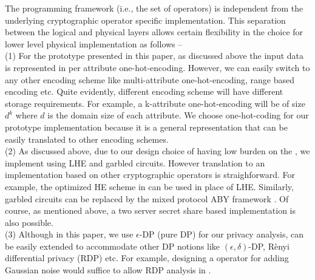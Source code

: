{ The programming framework (i.e., the set of \system operators) is independent from the underlying cryptographic operator specific implementation. This separation between the logical and physical layers allows certain flexibility in the choice for lower level physical implementation as follows --
\\(1)  For the prototype \system presented in this paper, as discussed above the input data is represented in per attribute one-hot-encoding. However, we can easily switch to any other encoding scheme like multi-attribute one-hot-encoding, range based encoding etc. Quite evidently, different encoding scheme will have different storage requirements. For example, a k-attribute one-hot-encoding will be of size $d^k$ where $d$ is the domain size of each attribute. We choose one-hot-coding for our prototype \system implementation because it is a general representation that can be easily translated to other encoding schemes.  
\\(2)  As discussed above, due to our design choice of having low burden on the \CSP, we implement \system using LHE and garbled circuits. However translation to an implementation based on other cryptographic operators is straighforward. For example, the optimized HE scheme in \cite{Blatt2019OptimizedHE} can be used in place of LHE. Similarly, garbled circuits can be replaced by the mixed protocol ABY framework \cite{Demmler2015ABYA}. Of course, as mentioned above, a two server secret share based implementation is also possible. 
\\ (3) Although in this paper, we use $\epsilon$-DP (pure DP) for our privacy analysis, \system can be easily extended to accommodate other DP notions like $(\epsilon,\delta)$-DP, R\`enyi differential privacy (RDP) \cite{RDP} etc. For example, designing a operator for adding Gaussian noise would suffice to allow RDP analysis in \system.
}